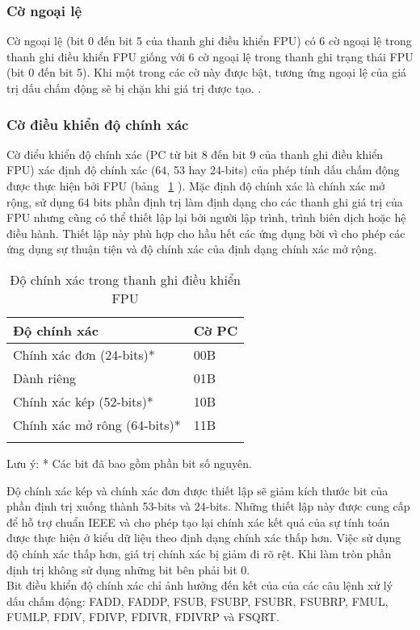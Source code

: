 		\subsubsection*{ Cờ ngoại lệ}
	Cờ ngoại lệ (bit 0 đến bit 5 của thanh ghi điều khiển FPU) có 6 cờ ngoại lệ trong thanh ghi điều khiển FPU giống với 6 cờ ngoại lệ trong thanh ghi trạng thái FPU (bit 0 đến bit 5). Khi một trong các cờ này được bật, tương ứng ngoại lệ của giá trị dấu chấm động sẽ bị chặn khi giá trị được tạo.
.
	\subsubsection*{ Cờ điều khiển độ chính xác}
	Cờ điểu khiển độ chính xác (PC từ bit 8 đến bit 9 của thanh ghi điều khiển FPU) xác định độ chính xác (64, 53 hay 24-bits) của phép tính dấu chấm động được thực hiện bởi FPU (bảng ~\ref{tb:DoChinhXac} ). Mặc định độ chính xác là chính xác mở rộng, sử dụng 64 bits phần định trị làm định dạng cho các thanh ghi giá trị của FPU nhưng cũng có thể thiết lập lại bởi người lập trình, trình biên dịch hoặc hệ điều hành. Thiết lập này phù hợp cho hầu hết các ứng dụng bời vì cho phép các ứng dụng sự thuận tiện và độ chính xác của định dạng chính xác mở rộng.
	\begin{longtable}{|m{6cm}|m{4cm}|}
		\hline
			Độ chính xác & Cờ PC \\
		\hline
		\hline
		Chính xác đơn (24-bits)* & 00B \\
		\hline
		Dành riêng  & 01B \\
		\hline
		Chính xác kép (52-bits)* & 10B \\
		\hline
		Chính xác mở rông (64-bits)* & 11B \\
		\hline	
		\caption{Độ chính xác trong thanh ghi điều khiển FPU}
		\label{tb:DoChinhXac}
	\end{longtable}
	
	Lưu ý: * Các bit đã bao gồm phần bit số nguyên. 
		
	Độ chính xác kép và chính xác đơn được thiết lập sẽ giảm kích thước bit của phần định trị xuống thành 53-bits và 24-bits. Những thiết lập này được cung cấp để hỗ trợ chuẩn IEEE và cho phép tạo lại chính xác kết quả của sự tính toán được thực hiện ở kiểu dữ liệu theo định dạng chính xác thấp hơn. Việc sử dụng độ chính xác thấp hơn, giá trị chính xác bị giảm đi rõ rệt. Khi làm tròn phần định trị không sử dụng những bit bên phải bit 0. \\
	
	Bit điều khiển độ chính xác chỉ ảnh hưởng đến kết của của các câu lệnh xử lý dấu chấm động: FADD, FADDP, FSUB, FSUBP, FSUBR, FSUBRP, FMUL, FUMLP, FDIV, FDIVP, FDIVR, FDIVRP và FSQRT.

